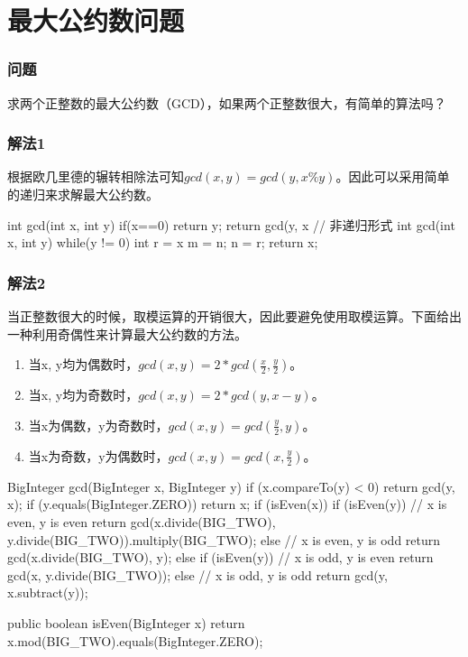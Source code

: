 \section{最大公约数问题} %
\label{sec:gcd}

\subsubsection{问题}
求两个正整数的最大公约数（GCD），如果两个正整数很大，有简单的算法吗？

\subsubsection{解法1}

根据欧几里德的辗转相除法可知$gcd(x, y) = gcd(y, x \% y)$。因此可以采用简单的递归来求解最大公约数。

\begin{Codex}[label={[$O(lg(Max(x,y)))+O(1)$]Chap02_07_GCD.java}]
	int gcd(int x, int y) {
		if(x==0) return y;
		return gcd(y, x %
	}
	// 非递归形式
	int gcd(int x, int y) {
		while(y != 0) {
			int r = x %
			m = n;
			n = r;
		}
		return x;
	}
\end{Codex}

\subsubsection{解法2}

当正整数很大的时候，取模运算的开销很大，因此要避免使用取模运算。下面给出一种利用奇偶性来计算最大公约数的方法。
\begin{enumerate}
	\item 当x, y均为偶数时，$gcd(x,y) = 2 * gcd(\frac{x}{2}, \frac{y}{2})$。	
	\item 当x, y均为奇数时，$gcd(x,y) = 2 * gcd(y, x-y)$。
	\item 当x为偶数，y为奇数时，$gcd(x,y) = gcd(\frac{y}{2}, y)$。
	\item 当x为奇数，y为偶数时，$gcd(x,y) = gcd(x, \frac{y}{2})$。
\end{enumerate}

\begin{Codex}[label={[$O(lg(Max(x,y)))+O(1)$]Chap02_07_GCD.java}]
	BigInteger gcd(BigInteger x, BigInteger y) {
		if (x.compareTo(y) < 0) {
			return gcd(y, x);
		}
		if (y.equals(BigInteger.ZERO)) {
			return x;
		}
		if (isEven(x)) {
			if (isEven(y)) { // x is even, y is even
				return gcd(x.divide(BIG_TWO), y.divide(BIG_TWO)).multiply(BIG_TWO);
			} else { // x is even, y is odd
			return gcd(x.divide(BIG_TWO), y);	
		}
	} else {
	if (isEven(y)) { // x is odd, y is even
		return gcd(x, y.divide(BIG_TWO));
	} else { // x is odd, y is odd
	return gcd(y, x.subtract(y));
}
}
}

public boolean isEven(BigInteger x) {
	return x.mod(BIG_TWO).equals(BigInteger.ZERO);
}
\end{Codex}

